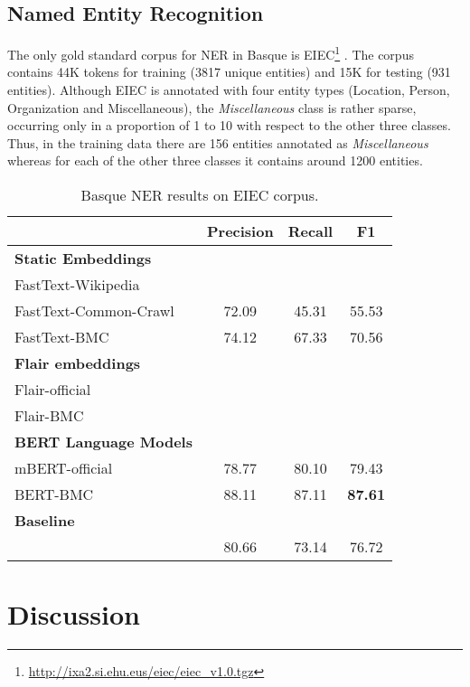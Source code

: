 \documentclass[10pt, a4paper]{article}
\begin{document}
\subsection{Named Entity Recognition}\label{sec:named-entity-recogn}

The only gold standard corpus for NER in Basque is EIEC\footnote{\url{http://ixa2.si.ehu.eus/eiec/eiec_v1.0.tgz}} \cite{alegria2006lessons}. The corpus contains 44K tokens for training (3817 unique entities) and 15K for testing (931 entities). Although EIEC is annotated with four entity types (Location, Person, Organization and Miscellaneous), the \emph{Miscellaneous} class is rather sparse, occurring only in a proportion of 1 to 10 with respect to the other three classes. Thus, in the training data there are 156 entities annotated as \emph{Miscellaneous} whereas for each of the other three classes it contains around 1200 entities.

\begin{table}[!t]\footnotesize
\centering
\begin{tabular}{@{\hspace{0.3cm}}lccc} \hline
 \textbf{} &\textbf{Precision} & \textbf{Recall} & \textbf{F1} \\ \hline
\textbf{Static Embeddings} & & &  \\
FastText-Wikipedia & & & \\
FastText-Common-Crawl & 72.09 & 45.31 & 55.53 \\
FastText-BMC  & 74.12 & 67.33 & 70.56 \\
\hline%
\textbf{Flair embeddings}\\
Flair-official &  &  &  \\
Flair-BMC & & &  \\ \hline
\textbf{BERT Language Models} \\
mBERT-official  & 78.77 &80.10 & 79.43 \\
BERT-BMC  & 88.11 & 87.11& \textbf{87.61} \\ \hline
\textbf{Baseline} \\
\cite{agerri2016robust} & 80.66 & 73.14 & 76.72 \\ \hline
\end{tabular}
\caption{Basque NER results on EIEC corpus.}\label{tab:ner}
\end{table}



\section{Discussion}\label{sec:discussion}
\end{document}

